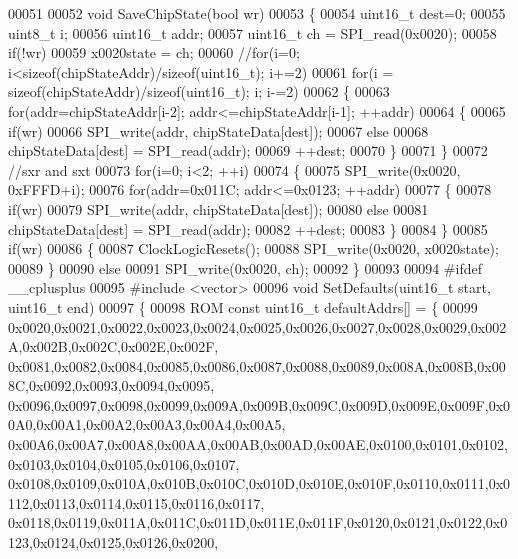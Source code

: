 \begin{DoxyCode}
00051 
00052 \textcolor{keywordtype}{void} SaveChipState(\textcolor{keywordtype}{bool} wr)
00053 \{
00054     uint16\_t dest=0;
00055     uint8\_t i;
00056     uint16\_t addr;
00057     uint16\_t ch = SPI_read(0x0020);
00058     \textcolor{keywordflow}{if}(!wr)
00059         x0020state = ch;
00060     \textcolor{comment}{//for(i=0; i<sizeof(chipStateAddr)/sizeof(uint16\_t); i+=2)}
00061     \textcolor{keywordflow}{for}(i = \textcolor{keyword}{sizeof}(chipStateAddr)/\textcolor{keyword}{sizeof}(uint16\_t); i; i-=2)
00062     \{
00063         \textcolor{keywordflow}{for}(addr=chipStateAddr[i-2]; addr<=chipStateAddr[i-1]; ++addr)
00064         \{
00065             \textcolor{keywordflow}{if}(wr)
00066                 SPI_write(addr, chipStateData[dest]);
00067             \textcolor{keywordflow}{else}
00068                 chipStateData[dest] = SPI_read(addr);
00069             ++dest;
00070         \}
00071     \}
00072     \textcolor{comment}{//sxr and sxt}
00073     \textcolor{keywordflow}{for}(i=0; i<2; ++i)
00074     \{
00075         SPI_write(0x0020, 0xFFFD+i);
00076         \textcolor{keywordflow}{for}(addr=0x011C; addr<=0x0123; ++addr)
00077         \{
00078             \textcolor{keywordflow}{if}(wr)
00079                 SPI_write(addr, chipStateData[dest]);
00080             \textcolor{keywordflow}{else}
00081                 chipStateData[dest] = SPI_read(addr);
00082             ++dest;
00083         \}
00084     \}
00085     \textcolor{keywordflow}{if}(wr)
00086     \{
00087         ClockLogicResets();
00088         SPI_write(0x0020, x0020state);
00089     \}
00090     \textcolor{keywordflow}{else}
00091         SPI_write(0x0020, ch);
00092 \}
00093 
00094 \textcolor{preprocessor}{#ifdef \_\_cplusplus}
00095 \textcolor{preprocessor}{#include <vector>}
00096 \textcolor{keywordtype}{void} SetDefaults(uint16\_t start, uint16\_t end)
00097 \{
00098     ROM \textcolor{keyword}{const} uint16\_t defaultAddrs[] = \{
00099 0x0020,0x0021,0x0022,0x0023,0x0024,0x0025,0x0026,0x0027,0x0028,0x0029,0x002A,0x002B,0x002C,0x002E,0x002F,
      0x0081,0x0082,0x0084,0x0085,0x0086,0x0087,0x0088,0x0089,0x008A,0x008B,0x008C,0x0092,0x0093,0x0094,0x0095,
      0x0096,0x0097,0x0098,0x0099,0x009A,0x009B,0x009C,0x009D,0x009E,0x009F,0x00A0,0x00A1,0x00A2,0x00A3,0x00A4,0x00A5,
      0x00A6,0x00A7,0x00A8,0x00AA,0x00AB,0x00AD,0x00AE,0x0100,0x0101,0x0102,0x0103,0x0104,0x0105,0x0106,0x0107,
      0x0108,0x0109,0x010A,0x010B,0x010C,0x010D,0x010E,0x010F,0x0110,0x0111,0x0112,0x0113,0x0114,0x0115,0x0116,0x0117,
      0x0118,0x0119,0x011A,0x011C,0x011D,0x011E,0x011F,0x0120,0x0121,0x0122,0x0123,0x0124,0x0125,0x0126,0x0200,

\end{DoxyCode}
